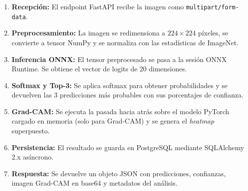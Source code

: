 \documentclass[12pt,a4paper]{article}
\begin{document}
\begin{enumerate}
    \item \textbf{Recepción:} El endpoint FastAPI recibe la imagen como \texttt{multipart/form-data}.
    \item \textbf{Preprocesamiento:} La imagen se redimensiona a $224 \times 224$ píxeles, se convierte a tensor NumPy y se normaliza con las estadísticas de ImageNet.
    \item \textbf{Inferencia ONNX:} El tensor preprocesado se pasa a la sesión ONNX Runtime. Se obtiene el vector de logits de 20 dimensiones.
    \item \textbf{Softmax y Top-3:} Se aplica softmax para obtener probabilidades y se devuelven las 3 predicciones más probables con sus porcentajes de confianza.
    \item \textbf{Grad-CAM:} Se ejecuta la pasada hacia atrás sobre el modelo PyTorch cargado en memoria (solo para Grad-CAM) y se genera el \textit{heatmap} superpuesto.
    \item \textbf{Persistencia:} El resultado se guarda en PostgreSQL mediante SQLAlchemy 2.x asíncrono.
    \item \textbf{Respuesta:} Se devuelve un objeto JSON con predicciones, confianzas, imagen Grad-CAM en base64 y metadatos del análisis.
\end{enumerate}
\end{document}
